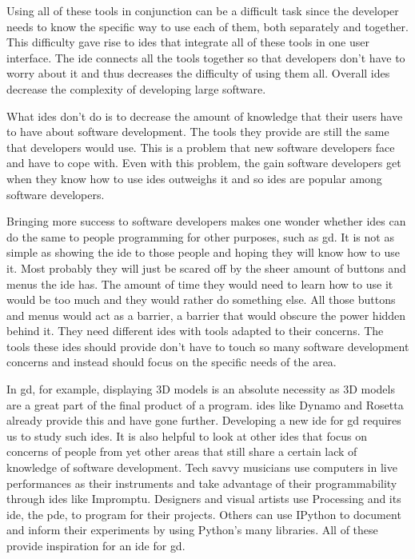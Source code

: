\documentclass{./llncs2e/llncs}
\begin{document}
	Using all of these tools in conjunction can be a difficult task since the developer needs to know the specific way to use each of them, both separately and together.
	This difficulty gave rise to \ac{ide}s that integrate all of these tools in one user interface.
	The \ac{ide} connects all the tools together so that developers don't have to worry about it and thus decreases the difficulty of using them all.
	Overall \ac{ide}s decrease the complexity of developing large software.

	What \ac{ide}s don't do is to decrease the amount of knowledge that their users have to have about software development.
	The tools they provide are still the same that developers would use.
	This is a problem that new software developers face and have to cope with.
	Even with this problem, the gain software developers get when they know how to use \ac{ide}s outweighs it and so \ac{ide}s are popular among software developers.

	Bringing more success to software developers makes one wonder whether \ac{ide}s can do the same to people programming for other purposes, such as \ac{gd}.
	It is not as simple as showing the \ac{ide} to those people and hoping they will know how to use it.
	Most probably they will just be scared off by the sheer amount of buttons and menus the \ac{ide} has.
	The amount of time they would need to learn how to use it would be too much and they would rather do something else.
	All those buttons and menus would act as a barrier, a barrier that would obscure the power hidden behind it.
	They need different \ac{ide}s with tools adapted to their concerns.
	The tools these \ac{ide}s should provide don't have to touch so many software development concerns and instead should focus on the specific needs of the area.

	In \ac{gd}, for example, displaying 3D models is an absolute necessity as 3D models are a great part of the final product of a program.
	\ac{ide}s like Dynamo and Rosetta already provide this and have gone further.
	Developing a new \ac{ide} for \ac{gd} requires us to study such \ac{ide}s.
	It is also helpful to look at other \ac{ide}s that focus on concerns of people from yet other areas that still share a certain lack of knowledge of software development.
	Tech savvy musicians use computers in live performances as their instruments and take advantage of their programmability through \ac{ide}s like Impromptu.
	Designers and visual artists use Processing and its \ac{ide}, the \ac{pde}, to program for their projects.
	Others can use IPython to document and inform their experiments by using Python's many libraries.
	All of these provide inspiration for an \ac{ide} for \ac{gd}.
	
\end{document}
